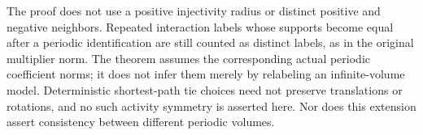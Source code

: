 The proof does not use a positive injectivity radius or distinct positive
and negative neighbors. Repeated interaction labels whose supports become
equal after a periodic identification are still counted as distinct labels,
as in the original multiplier norm. The theorem assumes the corresponding
actual periodic coefficient norms; it does not infer them merely by
relabeling an infinite-volume model. Deterministic shortest-path tie choices
need not preserve translations or rotations, and no such activity symmetry
is asserted here. Nor does this extension assert consistency between
different periodic volumes.
